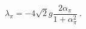 \begin{equation} 
	\lambda_\pi=-4\sqrt{2}g\frac{2\alpha_{\pi}}{1+\alpha^{2}_{\pi}}\ .
	\end{equation} 
